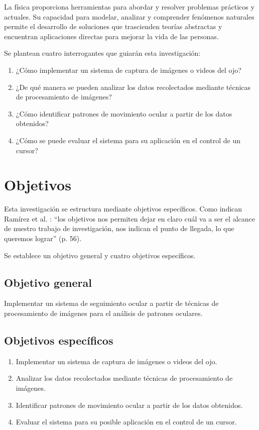La física proporciona herramientas para abordar y resolver problemas prácticos y actuales. Su capacidad para modelar, analizar y comprender fenómenos naturales permite el desarrollo de soluciones que trascienden teorías abstractas y encuentran aplicaciones directas para mejorar la vida de las personas.

Se plantean cuatro interrogantes que guiarán esta investigación:

\begin{enumerate}
	\item ¿Cómo implementar un sistema de captura de imágenes o videos del ojo?
	\item ¿De qué manera se pueden analizar los datos recolectados mediante técnicas de procesamiento de imágenes?
	\item ¿Cómo identificar patrones de movimiento ocular a partir de los datos obtenidos?
	\item ¿Cómo se puede evaluar el sistema para su aplicación en el control de un cursor?
\end{enumerate}

\section{Objetivos}

Esta investigación se estructura mediante objetivos específicos. Como indican Ramírez et al. \cite{ramirez2004}: ``los objetivos nos permiten dejar en claro cuál va a ser el alcance de nuestro trabajo de investigación, nos indican el punto de llegada, lo que queremos lograr'' (p. 56).

Se establece un objetivo general y cuatro objetivos específicos.

\subsection{Objetivo general}
Implementar un sistema de seguimiento ocular a partir de técnicas de procesamiento de imágenes para el análisis de patrones oculares.

\subsection{Objetivos específicos}
\begin{enumerate}
	\item Implementar un sistema de captura de imágenes o videos del ojo.
	\item Analizar los datos recolectados mediante técnicas de procesamiento de imágenes.
	\item Identificar patrones de movimiento ocular a partir de los datos obtenidos.
	\item Evaluar el sistema para su posible aplicación en el control de un cursor.
\end{enumerate}

